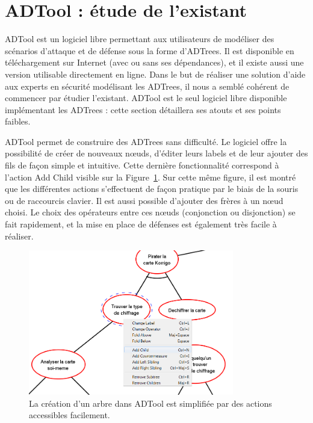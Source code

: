 \section{ADTool : étude de l'existant}
	\label{sec:adtool}

	ADTool est un logiciel libre permettant aux utilisateurs de modéliser des scénarios d'attaque et de défense sous la forme d'ADTrees. Il est disponible en téléchargement sur Internet (avec ou sans ses dépendances), et il existe aussi une version utilisable directement en ligne. Dans le but de réaliser une solution d'aide aux experts en sécurité modélisant les ADTrees, il nous a semblé cohérent de commencer par étudier l'existant. ADTool est le seul logiciel libre disponible implémentant les ADTrees : cette section détaillera ses atouts et ses points faibles.

	ADTool permet de construire des ADTrees sans difficulté. Le logiciel offre la possibilité de créer de nouveaux nœuds, d'éditer leurs labels et de leur ajouter des fils de façon simple et intuitive. Cette dernière fonctionnalité correspond à l'action \og Add Child \fg{} visible sur la {\sc Figure}~\ref{fig:arbre_exemple_1}. Sur cette même figure, il est montré que les différentes actions s'effectuent de façon pratique par le biais de la souris ou de raccourcis clavier. Il est aussi possible d'ajouter des frères à un nœud choisi. Le choix des opérateurs entre ces nœuds (conjonction ou disjonction) se fait rapidement, et la mise en place de défenses est également très facile à réaliser. 
	
	\begin{figure}[h]
        \centering
        \includegraphics[width=0.8\textwidth]{figure/adtool_add_child.png}
        \caption{La création d'un arbre dans ADTool est simplifiée par des actions accessibles facilement.}
        \label{fig:arbre_exemple_1}
    \end{figure}
	
